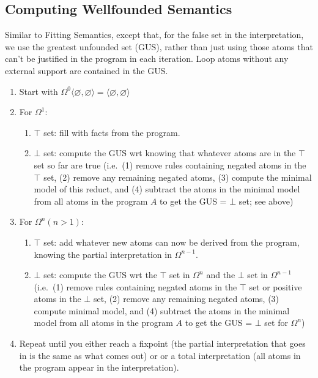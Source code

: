 \documentclass[9pt,a4paper,landscape]{article}
\begin{document}
{\subsection{Computing Wellfounded Semantics}
\label{subsec:wellf-sem}

Similar to Fitting Semantics, except that, for the false set in the interpretation, we use the greatest unfounded set (GUS), rather than just using those atoms that can't be justified in the program in each iteration.
Loop atoms without any external support are contained in the GUS.

\begin{enumerate}[noitemsep]
	\item Start with $\Omega^0 \langle \varnothing, \varnothing \rangle = \langle \varnothing, \varnothing \rangle$
	\item For $\Omega^1$:
	\begin{enumerate}[noitemsep]
		\item $\top$ set: fill with facts from the program.
		\item $\bot$ set: compute the GUS wrt knowing that whatever atoms are in the $\top$ set so far are true (i.e.\ (1) remove rules containing negated atoms in the $\top$ set, (2) remove any remaining negated atoms, (3) compute the minimal model of this reduct, and (4) subtract the atoms in the minimal model from all atoms in the program $A$ to get the GUS = $\bot$ set; see above)
	\end{enumerate}
	\item For $\Omega^n (n>1)$:
	\begin{enumerate}[noitemsep]
		\item $\top$ set: add whatever new atoms can now be derived from the program, knowing the partial interpretation in $\Omega^{n-1}$.
		\item $\bot$ set: compute the GUS wrt the $\top$ set in $\Omega^n$ and the $\bot$ set in $\Omega^{n-1}$ (i.e.\ (1) remove rules containing negated atoms in the $\top$ set or positive atoms in the $\bot$ set, (2) remove any remaining negated atoms, (3) compute minimal model, and (4) subtract the atoms in the minimal model from all atoms in the program $A$ to get the GUS = $\bot$ set for  $\Omega^{n}$)
	\end{enumerate}	
	\item Repeat until you either reach a fixpoint (the partial interpretation that goes in is the same as what comes out) or or a total interpretation (all atoms in the program appear in the interpretation).
\end{enumerate}

}
\end{document}
